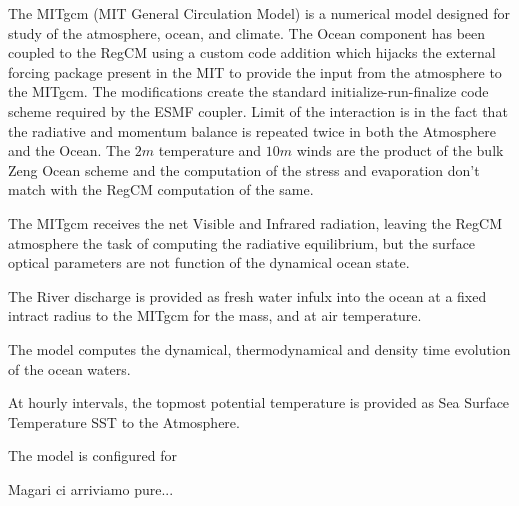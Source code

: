 \documentclass[journal abbreviation, manuscript]{copernicus}
\begin{document}
The MITgcm (MIT General Circulation Model) is a numerical model designed for
study of the atmosphere, ocean, and climate. The Ocean component has been
coupled to the RegCM using a custom code addition which hijacks the external
forcing package present in the MIT to provide the input from the atmosphere
to the MITgcm. The modifications create the standard initialize-run-finalize
code scheme required by the ESMF coupler. Limit of the interaction is in the
fact that the radiative and momentum balance is repeated twice in both the
Atmosphere and the Ocean. The $2 m$ temperature and $10 m$ winds are the
product of the bulk Zeng Ocean scheme \citet{zeng-2005} and the computation
of the stress and evaporation don't match with the RegCM computation of the
same.

The MITgcm receives the net Visible and Infrared radiation, leaving the RegCM
atmosphere the task of computing the radiative equilibrium, but the surface
optical parameters are not function of the dynamical ocean state.

The River discharge is provided as fresh water infulx into the ocean at a
fixed intract radius to the MITgcm for the mass, and at air temperature.

The model computes the dynamical, thermodynamical and density time evolution
of the ocean waters.

At hourly intervals, the topmost potential temperature is provided as Sea
Surface Temperature SST to the Atmosphere.

The model is configured for 

\conclusions  %

Magari ci arriviamo pure...

\end{document}
